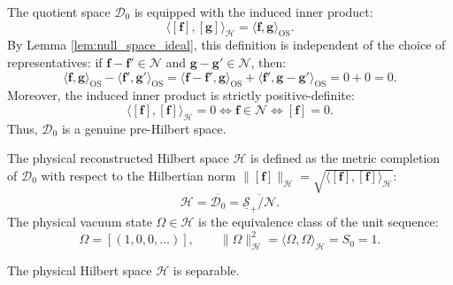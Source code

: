 \begin{definition}
\label{def:physical_hilbert_space_gns}
The quotient space $\mathcal{D}_0$ is equipped with the induced inner product:
\begin{equation}
\label{eq:induced_inner_product}
\langle [\mathbf{f}], [\mathbf{g}] \rangle_{\mathcal{H}} = \langle \mathbf{f}, \mathbf{g} \rangle_{\mathrm{OS}}.
\end{equation}
By Lemma \ref{lem:null_space_ideal}, this definition is independent of the choice of representatives: if $\mathbf{f} - \mathbf{f}' \in \mathcal{N}$ and $\mathbf{g} - \mathbf{g}' \in \mathcal{N}$, then:
\begin{equation}
\langle \mathbf{f}, \mathbf{g} \rangle_{\mathrm{OS}} - \langle \mathbf{f}', \mathbf{g}' \rangle_{\mathrm{OS}} = \langle \mathbf{f} - \mathbf{f}', \mathbf{g} \rangle_{\mathrm{OS}} + \langle \mathbf{f}', \mathbf{g} - \mathbf{g}' \rangle_{\mathrm{OS}} = 0 + 0 = 0.
\end{equation}
Moreover, the induced inner product is strictly positive-definite:
\begin{equation}
\langle [\mathbf{f}], [\mathbf{f}] \rangle_{\mathcal{H}} = 0 \iff \mathbf{f} \in \mathcal{N} \iff [\mathbf{f}] = 0.
\end{equation}
Thus, $\mathcal{D}_0$ is a genuine pre-Hilbert space.

The physical reconstructed Hilbert space $\mathcal{H}$ is defined as the metric completion of $\mathcal{D}_0$ with respect to the Hilbertian norm $\|[\mathbf{f}]\|_{\mathcal{H}} = \sqrt{\langle [\mathbf{f}], [\mathbf{f}] \rangle_{\mathcal{H}}}$:
\begin{equation}
\label{eq:physical_hilbert_space_def}
\mathcal{H} = \overline{\mathcal{D}_0} = \overline{\underline{\mathcal{S}}_+ / \mathcal{N}}.
\end{equation}
The physical vacuum state $\Omega \in \mathcal{H}$ is the equivalence class of the unit sequence:
\begin{equation}
\label{eq:vacuum_state_def}
\Omega = [(1, 0, 0, \dots)], \qquad \|\Omega\|_{\mathcal{H}}^2 = \langle \Omega, \Omega \rangle_{\mathcal{H}} = S_0 = 1.
\end{equation}
\end{definition}

\begin{proposition}
\label{prop:hilbert_separability}
The physical Hilbert space $\mathcal{H}$ is separable.
\end{proposition}

